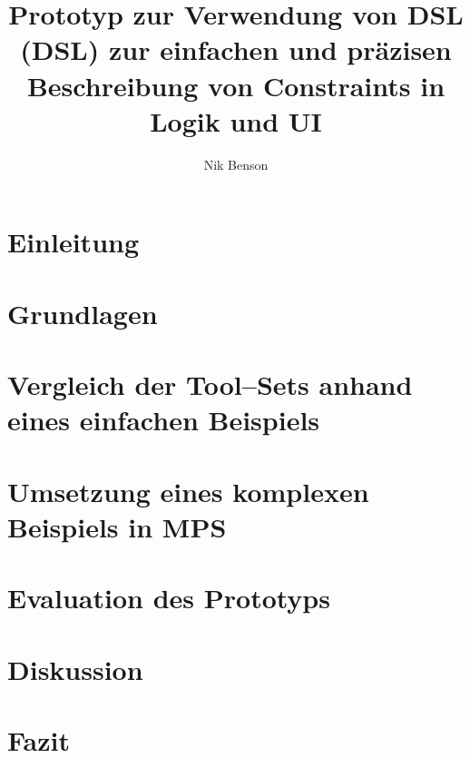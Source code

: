 \documentclass[12pt]{article}
\title{Prototyp zur Verwendung von \acl{DSL} (\acs{DSL}) zur einfachen und präzisen Beschreibung von Constraints in Logik und \acs{UI}}
\author{Nik Benson}
\affil{\href{mailto:nik.benson@studmail.w-hs.de}{nik.benson@studmail.w-hs.de}}
\begin{document}
    

    


    \section{Einleitung}\label{sec:einleitung}
    


    \section{Grundlagen}\label{sec:grundlagen}
    


    \section{Vergleich der Tool--Sets anhand eines einfachen Beispiels}\label{sec:vergleich-der-tool-sets-anhand-eines-einfachen-beispiels}
    


    \section{Umsetzung eines komplexen Beispiels in \acs{MPS}}\label{sec:umsetzung-eines-komplexen-beispiels-in-mps}
    


    \section{Evaluation des Prototyps}\label{sec:evaluation-des-prototypen}
    


    \section{Diskussion}\label{sec:diskussion}
    


    \section{Fazit}\label{sec:fazit}
    

    

    
\end{document}
